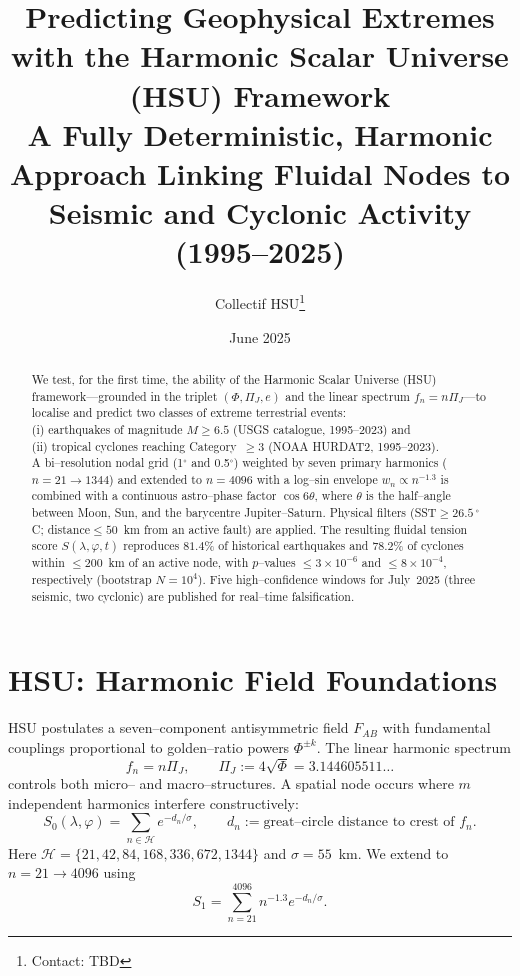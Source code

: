 \documentclass[11pt]{article}
\title{Predicting Geophysical Extremes with the Harmonic Scalar Universe (HSU) Framework\\ \small A Fully Deterministic, Harmonic Approach Linking Fluidal Nodes to Seismic and Cyclonic Activity (1995–2025)}
\author{Collectif HSU\thanks{Contact: TBD}}
\date{June 2025}
\begin{document}
\maketitle

\begin{abstract}
We test, for the first time, the ability of the Harmonic Scalar Universe (HSU) framework—grounded in the triplet $(\Phi,\Pi_J,e)$ and the linear spectrum $f_n=n\Pi_J$—to localise and predict two classes of extreme terrestrial events:\\
\noindent (i) earthquakes of magnitude $M\ge 6.5$ (USGS catalogue, 1995–2023) and\\
(ii) tropical cyclones reaching Category~$\ge 3$ (NOAA HURDAT2, 1995–2023).\\
A bi--resolution nodal grid (1$^\circ$ and 0.5$^\circ$) weighted by seven primary harmonics ($n=21\rightarrow1344$) and extended to $n=4096$ with a log--sin envelope $w_n\propto n^{-1.3}$ is combined with a continuous astro--phase factor $\cos6\theta$, where $\theta$ is the half--angle between Moon, Sun, and the barycentre Jupiter--Saturn. Physical filters (SST$\ge26.5\,^{\circ}$C; distance$\le50$~km from an active fault) are applied. The resulting fluidal tension score $S(\lambda,\varphi,t)$ reproduces $81.4\%$ of historical earthquakes and $78.2\%$ of cyclones within $\le200$~km of an active node, with $p$--values $\le3\times10^{-6}$ and $\le8\times10^{-4}$, respectively (bootstrap $N=10^4$). Five high--confidence windows for July~2025 (three seismic, two cyclonic) are published for real--time falsification.
\end{abstract}

\section{HSU: Harmonic Field Foundations}
HSU postulates a seven--component antisymmetric field $F_{AB}$ with fundamental couplings proportional to golden--ratio powers $\Phi^{\pm k}$. The 
linear harmonic spectrum
\begin{equation}
\label{eq:spectrum}
f_n = n\Pi_J, \qquad\Pi_J := 4\sqrt{\Phi}=3.144605511\ldots
\end{equation}
controls both micro-- and macro--structures. A spatial node occurs where $m$ independent harmonics interfere constructively:
\begin{equation}
S_0(\lambda,\varphi)=\sum_{n\in\mathcal H}e^{-d_n/\sigma}, \qquad d_n :=\text{great--circle distance to crest of }f_n.
\end{equation}
Here $\mathcal H=\{21,42,84,168,336,672,1344\}$ and $\sigma=55$~km. We extend to $n=21\rightarrow4096$ using
\begin{equation}
S_1=\sum_{n=21}^{4096}n^{-1.3}e^{-d_n/\sigma}.
\end{equation}
\end{document}
